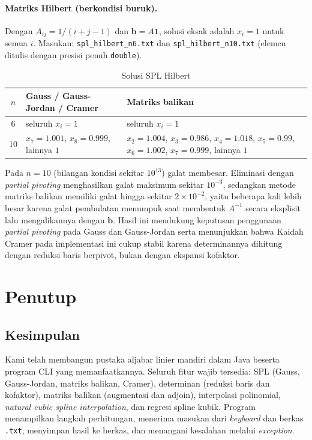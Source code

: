 \documentclass[12pt,a4paper]{article}
\begin{document}
\paragraph{Matriks Hilbert (berkondisi buruk).} Dengan $A_{ij}=1/(i+j-1)$ dan $\mathbf{b}=A\mathbf{1}$, solusi eksak adalah $x_i=1$ untuk semua $i$. Masukan: \texttt{spl\_hilbert\_n6.txt} dan \texttt{spl\_hilbert\_n10.txt} (elemen ditulis dengan presisi penuh \texttt{double}).
\begin{table}[H]
\centering\small
\renewcommand{\arraystretch}{1.2}
\begin{tabular}{@{}cp{4.9cm}p{6.2cm}@{}}
\toprule
\textbf{$n$} & \textbf{Gauss / Gauss-Jordan / Cramer} & \textbf{Matriks balikan}\\
\midrule
6 & seluruh $x_i=1$ & seluruh $x_i=1$\\
10 & $x_7=1.001$, $x_8=0.999$, lainnya $1$ & $x_2=1.004$, $x_3=0.986$, $x_4=1.018$, $x_5=0.99$, $x_6=1.002$, $x_7=0.999$, lainnya $1$\\
\bottomrule
\end{tabular}
\caption{Solusi SPL Hilbert}
\end{table}
Pada $n=10$ (bilangan kondisi sekitar $10^{13}$) galat membesar. Eliminasi dengan \textit{partial pivoting} menghasilkan galat maksimum sekitar $10^{-3}$, sedangkan metode matriks balikan memiliki galat hingga sekitar $2\times10^{-2}$, yaitu beberapa kali lebih besar karena galat pembulatan menumpuk saat membentuk $A^{-1}$ secara eksplisit lalu mengalikannya dengan $\mathbf{b}$. Hasil ini mendukung keputusan penggunaan \textit{partial pivoting} pada Gauss dan Gauss-Jordan serta menunjukkan bahwa Kaidah Cramer pada implementasi ini cukup stabil karena determinannya dihitung dengan reduksi baris berpivot, bukan dengan ekspansi kofaktor.

\section{Penutup}

\subsection{Kesimpulan}
Kami telah membangun pustaka aljabar linier mandiri dalam Java beserta program CLI yang memanfaatkannya. Seluruh fitur wajib tersedia: SPL (Gauss, Gauss-Jordan, matriks balikan, Cramer), determinan (reduksi baris dan kofaktor), matriks balikan (augmentasi dan adjoin), interpolasi polinomial, \textit{natural cubic spline interpolation}, dan regresi spline kubik. Program menampilkan langkah perhitungan, menerima masukan dari \textit{keyboard} dan berkas \texttt{.txt}, menyimpan hasil ke berkas, dan menangani kesalahan melalui \textit{exception}.
\end{document}
